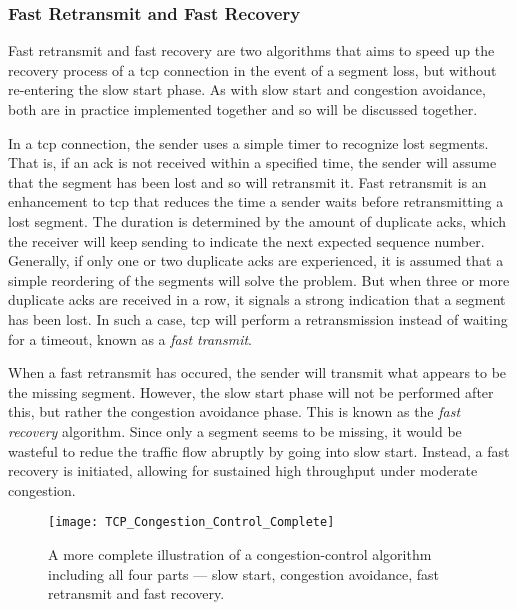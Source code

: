 \subsubsection{Fast Retransmit and Fast Recovery}

Fast retransmit and fast recovery are two algorithms that aims to speed up the recovery process of a \gls{tcp} connection in the event of a segment loss, but without re-entering the slow start phase. As with slow start and congestion avoidance, both are in practice implemented together and so will be discussed together.

In a \gls{tcp} connection, the sender uses a simple timer to recognize lost segments. That is, if an \gls{ack} is not received within a specified time, the sender will assume that the segment has been lost and so will retransmit it. Fast retransmit is an enhancement to \gls{tcp} that reduces the time a sender waits before retransmitting a lost segment. The duration is determined by the amount of duplicate \gls{ack}s, which the receiver will keep sending to indicate the next expected sequence number. Generally, if only one or two duplicate \gls{ack}s are experienced, it is assumed that a simple reordering of the segments will solve the problem. But when three or more duplicate \gls{ack}s are received in a row, it signals a strong indication that a segment has been lost. In such a case, \gls{tcp} will perform a retransmission instead of waiting for a timeout, known as a \textit{fast transmit}.

When a fast retransmit has occured, the sender will transmit what appears to be the missing segment. However, the slow start phase will not be performed after this, but rather the congestion avoidance phase. This is known as the \textit{fast recovery} algorithm. Since only a segment seems to be missing, it would be wasteful to redue the traffic flow abruptly by going into slow start. Instead, a fast recovery is initiated, allowing for sustained high throughput under moderate congestion.

\begin{figure}[H]
    \centering
    \texttt{[image: TCP\_Congestion\_Control\_Complete]}
    \captionsetup{width=0.6\textwidth}
    \caption{A more complete illustration of a congestion-control algorithm including all four parts --- slow start, congestion avoidance, fast retransmit and fast recovery. }
\end{figure}






